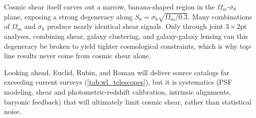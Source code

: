 \begin{observationblock}
Cosmic shear itself carves out a narrow, banana-shaped region in the $\Omega_m$-$\sigma_8$ plane, exposing a strong degeneracy along $S_8 = \sigma_8\sqrt{\Omega_m/0.3}$. Many combinations of $\Omega_m$ and $\sigma_8$ produce nearly identical shear signals. Only through joint $3\times2\text{pt}$ analyses, combining shear, galaxy clustering, and galaxy-galaxy lensing can this degeneracy be broken to yield tighter cosmological constraints, which is why top-line results never come from cosmic shear alone.
\end{observationblock}

Looking ahead, Euclid, Rubin, and Roman will deliver source catalogs far exceeding current surveys (\cref{tab:wl_telescopes}), but it is systematics (PSF modeling, shear and photometric-redshift calibration, intrinsic alignments, baryonic feedback) that will ultimately limit cosmic shear, rather than statistical noise.